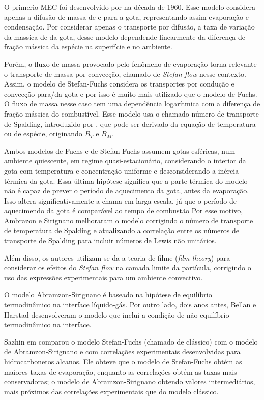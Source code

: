 
O primerio MEC foi desenvolvido por  na década de 1960. 
Esse modelo considera apenas a difusão de massa de e para a gota, representando assim evaporação e condensação.
Por considerar apenas o transporte por difusão, a taxa de variação da  massica de da gota, desse modelo dependende linearmente da diferença de fração mássica da espécie na superfície e no ambiente.

Porém, o fluxo de massa provocado pelo fenômeno de evaporação torna relevante o transporte de massa por convecção, chamado de \emph{Stefan flow} nesse contexto. 
Assim, o modelo de Stefan-Fuchs considera os transportes por condução e convecção para/da gota e por isso é muito mais utilizado que o modelo de Fuchs.
O fluxo de massa nesse caso tem uma dependência logarítmica com a diferença de fração mássica do combustível. 
Esse modelo usa o chamado número de transporte de Spalding, introduzido por , que pode ser derivado da equação de temperatura ou de espécie, originando $B_T$ e $B_M$.

Ambos modelos de Fuchs e de Stefan-Fuchs assumem gotas esféricas, num ambiente quiescente, em regime quasi-estacionário, considerando o interior da gota com temperatura e concentração uniforme e desconsiderando a inércia térmica da gota. 
Essa última hipótese significa que a parte térmica do modelo não é capaz de prever o período de aquecimento da gota, antes da evaporação.
Isso altera significativamente a chama em larga escala, já que o período de aquecimendo da gota é comparável ao tempo de combustão  
Por esse motivo, Ambrazon e Sirignano  melhoraram o modelo corrigindo o número de transporte de temperatura de Spalding
e atualizando a correlação entre os números de transporte de Spalding para incluir números de Lewis não unitários.

Além disso, os autores utilizam-se da a teoria de filme (\emph{film theory}) para considerar os efeitos do \emph{Stefan flow} na camada limite da partícula, corrigindo o uso das expressões experimentais para um ambiente convectivo. 

O modelo Abramzon-Sirignano é baseado na hipótese de equilíbrio termodinâmico na interface líquido-gás.
Por outro lado, dois anos antes, Bellan e Harstad  desenvolveram o modelo que inclui a condição de não equilíbrio termodinâmico na interface.

Sazhin em  comparou o modelo Stefan-Fuchs (chamado de clássico) com o modelo de Abramzon-Sirignano e com correlações experimentais desenvolvidas para hidrocarbonetos alcanos.
Ele obteve que o modelo de Stefan-Fuchs obtém as maiores taxas de evaporação, enquanto as correlações obtém as taxas mais conservadoras; o modelo de Abramzon-Sirignano obtendo valores intermediários, mais próximos das correlações experimentais que do modelo clássico.


